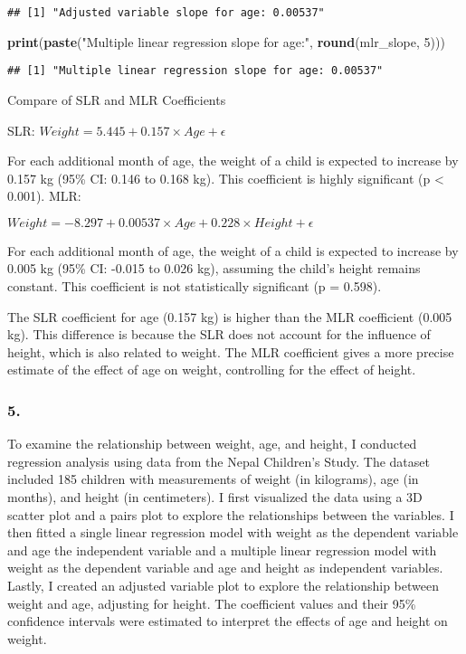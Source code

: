 \documentclass[
]{article}
\newenvironment{Shaded}{\begin{snugshade}}{\end{snugshade}}
\newcommand{\DecValTok}[1]{\textcolor[rgb]{0.00,0.00,0.81}{#1}}
\newcommand{\FunctionTok}[1]{\textcolor[rgb]{0.13,0.29,0.53}{\textbf{#1}}}
\newcommand{\NormalTok}[1]{#1}
\newcommand{\StringTok}[1]{\textcolor[rgb]{0.31,0.60,0.02}{#1}}
\begin{document}
\begin{verbatim}
## [1] "Adjusted variable slope for age: 0.00537"
\end{verbatim}

\begin{Shaded}
\begin{Highlighting}[]
\FunctionTok{print}\NormalTok{(}\FunctionTok{paste}\NormalTok{(}\StringTok{"Multiple linear regression slope for age:"}\NormalTok{, }\FunctionTok{round}\NormalTok{(mlr\_slope, }\DecValTok{5}\NormalTok{)))}
\end{Highlighting}
\end{Shaded}

\begin{verbatim}
## [1] "Multiple linear regression slope for age: 0.00537"
\end{verbatim}

Compare of SLR and MLR Coefficients

SLR: \(Weight = 5.445 +0.157×Age+\epsilon\)

For each additional month of age, the weight of a child is expected to
increase by 0.157 kg (95\% CI: 0.146 to 0.168 kg). This coefficient is
highly significant (p \textless{} 0.001). MLR:

\(Weight=−8.297+0.00537×Age+0.228×Height+\epsilon\)

For each additional month of age, the weight of a child is expected to
increase by 0.005 kg (95\% CI: -0.015 to 0.026 kg), assuming the child's
height remains constant. This coefficient is not statistically
significant (p = 0.598).

The SLR coefficient for age (0.157 kg) is higher than the MLR
coefficient (0.005 kg). This difference is because the SLR does not
account for the influence of height, which is also related to weight.
The MLR coefficient gives a more precise estimate of the effect of age
on weight, controlling for the effect of height.

\subsubsection{5.}\label{section-16}

To examine the relationship between weight, age, and height, I conducted
regression analysis using data from the Nepal Children's Study. The
dataset included 185 children with measurements of weight (in
kilograms), age (in months), and height (in centimeters). I first
visualized the data using a 3D scatter plot and a pairs plot to explore
the relationships between the variables. I then fitted a single linear
regression model with weight as the dependent variable and age the
independent variable and a multiple linear regression model with weight
as the dependent variable and age and height as independent variables.
Lastly, I created an adjusted variable plot to explore the relationship
between weight and age, adjusting for height. The coefficient values and
their 95\% confidence intervals were estimated to interpret the effects
of age and height on weight.
\end{document}
